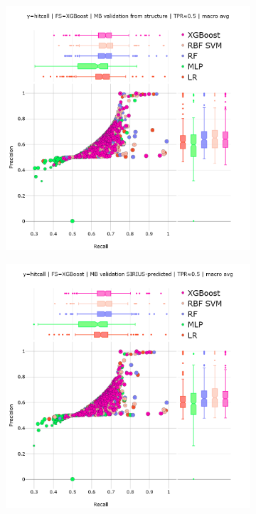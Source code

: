 \begin{figure}
  \centering
  \begin{subfigure}[b]{0.495\textwidth}
      \centering
      \includegraphics[width=\textwidth]{generated_results/hitcall_classification_Feature_Selection_XGBClassifier_mb_val_structure_tpr_macro_avg.png}
      \caption{}
  \label{fig:hitcall_classification_Feature_Selection_XGBClassifier_mb_val_structure_tpr_macro_avg}
  \end{subfigure}
  \hfill
  \begin{subfigure}[b]{0.495\textwidth}
      \centering
      \includegraphics[width=\textwidth]{generated_results/hitcall_classification_Feature_Selection_XGBClassifier_mb_val_sirius_tpr_macro_avg.png}

\end{subfigure}
\end{figure}
